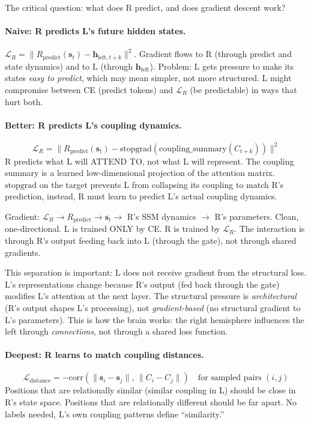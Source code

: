 \documentclass[11pt, a4paper]{article}
\newcommand{\h}{\mathbf{h}}
\theoremstyle{plain}
\theoremstyle{definition}
\theoremstyle{remark}
\begin{document}
The critical question: what does R predict, and does gradient descent work?

\paragraph{Naive: R predicts L's future hidden states.}
$\mathcal{L}_R = \|R_{\mathrm{predict}}(\mathbf{s}_t) - \h_{\mathrm{left}, t+k}\|^2$.
Gradient flows to R (through predict and state dynamics) and to L (through $\h_{\mathrm{left}}$).
Problem: L gets pressure to make its states \emph{easy to predict}, which may mean simpler, not more structured.
L might compromise between CE (predict tokens) and $\mathcal{L}_R$ (be predictable) in ways that hurt both.

\paragraph{Better: R predicts L's coupling dynamics.}
\begin{equation}
\mathcal{L}_R = \|R_{\mathrm{predict}}(\mathbf{s}_t) - \mathrm{stopgrad}(\mathrm{coupling\_summary}(C_{t+k}))\|^2
\end{equation}
R predicts what L will ATTEND TO, not what L will represent.
The coupling summary is a learned low-dimensional projection of the attention matrix.
$\mathrm{stopgrad}$ on the target prevents L from collapsing its coupling to match R's prediction, instead, R must learn to predict L's actual coupling dynamics.

Gradient: $\mathcal{L}_R \to R_{\mathrm{predict}} \to \mathbf{s}_t \to$ R's SSM dynamics $\to$ R's parameters. Clean, one-directional. L is trained ONLY by CE. R is trained by $\mathcal{L}_R$. The interaction is through R's output feeding back into L (through the gate), not through shared gradients.

This separation is important: L does not receive gradient from the structural loss.
L's representations change because R's output (fed back through the gate) modifies L's attention at the next layer.
The structural pressure is \emph{architectural} (R's output shapes L's processing), not \emph{gradient-based} (no structural gradient to L's parameters).
This is how the brain works: the right hemisphere influences the left through \emph{connections}, not through a shared loss function.

\paragraph{Deepest: R learns to match coupling distances.}
\begin{equation}
\mathcal{L}_{\mathrm{distance}} = -\mathrm{corr}\!\left(\|\mathbf{s}_i - \mathbf{s}_j\|, \, \|C_i - C_j\|\right) \quad \text{for sampled pairs } (i, j)
\end{equation}
Positions that are relationally similar (similar coupling in L) should be close in R's state space.
Positions that are relationally different should be far apart.
No labels needed, L's own coupling patterns define ``similarity.''
\end{document}
